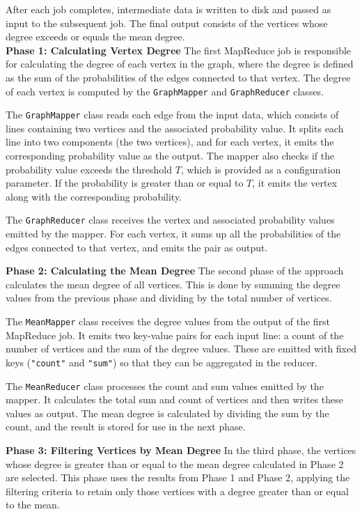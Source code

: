 \documentclass[acmlarge]{acmart}
\begin{document}
  After each job completes, intermediate data is written to disk and passed as input to the subsequent job.
  The final output consists of the vertices whose degree exceeds or equals the mean degree. \\

  \textbf{Phase 1: Calculating Vertex Degree}
  The first MapReduce job is responsible for calculating the degree of each vertex in the graph, where the degree is
  defined as the sum of the probabilities of the edges connected to that vertex.
  The degree of each vertex is computed by the \texttt{GraphMapper} and \texttt{GraphReducer} classes.

  The \texttt{GraphMapper} class reads each edge from the input data, which consists of lines containing two vertices
  and the associated probability value.
  It splits each line into two components (the two vertices), and for each vertex, it emits the corresponding probability
  value as the output.
  The mapper also checks if the probability value exceeds the threshold \( T \), which is provided as a configuration
  parameter.
  If the probability is greater than or equal to \( T \), it emits the vertex along with the corresponding probability.

  The \texttt{GraphReducer} class receives the vertex and associated probability values emitted by the mapper.
  For each vertex, it sums up all the probabilities of the edges connected to that vertex, and emits the pair as output.

  \textbf{Phase 2: Calculating the Mean Degree}
  The second phase of the approach calculates the mean degree of all vertices.
  This is done by summing the degree values from the previous phase and dividing by the total number of vertices.

  The \texttt{MeanMapper} class receives the degree values from the output of the first MapReduce job.
  It emits two key-value pairs for each input line: a count of the number of vertices and the sum of the degree values.
  These are emitted with fixed keys (\texttt{"count"} and \texttt{"sum"}) so that they can be aggregated in the reducer.

  The \texttt{MeanReducer} class processes the count and sum values emitted by the mapper.
  It calculates the total sum and count of vertices and then writes these values as output.
  The mean degree is calculated by dividing the sum by the count, and the result is stored for use in the next phase.

  \textbf{Phase 3: Filtering Vertices by Mean Degree}
  In the third phase, the vertices whose degree is greater than or equal to the mean degree calculated in Phase 2 are
  selected.
  This phase uses the results from Phase 1 and Phase 2, applying the filtering criteria to retain only those vertices with
  a degree greater than or equal to the mean.
\end{document}
